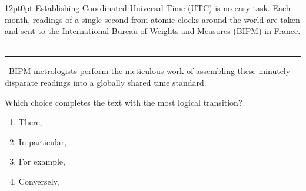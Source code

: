 \documentclass[11pt, twocolumn]{article}
\newcounter{questionnum}
\begin{document}
\vspace{6pt}\noindent
\begin{minipage}{\columnwidth}\raggedright
\noindent{}\par\vspace{8pt}
\begin{adjustwidth}{12pt}{0pt}
Establishing Coordinated Universal Time (UTC) is no easy task. Each month, readings of a single second from atomic clocks around the world are taken and sent to the International Bureau of Weights and Measures (BIPM) in France. \,\rule{2cm}{0.4pt}\, BIPM metrologists perform the meticulous work of assembling these minutely disparate readings into a globally shared time standard.
\vspace{6pt}

Which choice completes the text with the most logical transition?
\begin{enumerate}[label=\Alph*),leftmargin=18pt,topsep=3pt,itemsep=2pt]
  \item There,
  \item In particular,
  \item For example,
  \item Conversely,
\end{enumerate}
\end{adjustwidth}
\end{minipage}\par
\end{document}
